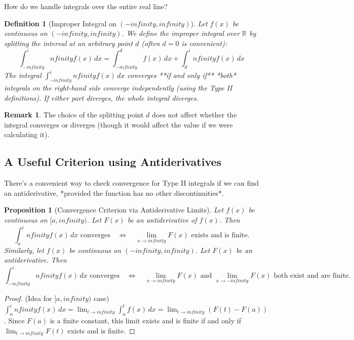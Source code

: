 \documentclass[11pt]{article}
\def\infty{infinity}%
\newtheorem{definition}[theorem]{Definition}
\newtheorem{proposition}[theorem]{Proposition}
\theoremstyle{definition}
\newtheorem{remark}[theorem]{Remark}
\newcommand{\dx}{\, dx} %
\newcommand{\R}{\mathbb{R}} %
\begin{document}
How do we handle integrals over the entire real line?

\begin{definition}[Improper Integral on $(-\infty, \infty)$]
    Let $f(x)$ be continuous on $(-\infty, \infty)$. We define the improper integral over $\R$ by splitting the interval at an arbitrary point $d$ (often $d=0$ is convenient):
    \[
    \int_{-\infty}^\infty f(x) \dx = \int_{-\infty}^d f(x) \dx + \int_d^\infty f(x) \dx
    \]
    The integral $\int_{-\infty}^\infty f(x) \dx$ converges **if and only if** *both* integrals on the right-hand side converge independently (using the Type II definitions). If either part diverges, the whole integral diverges.
\end{definition}

\begin{remark}
    The choice of the splitting point $d$ does not affect whether the integral converges or diverges (though it would affect the value if we were calculating it).
\end{remark}

\subsection{A Useful Criterion using Antiderivatives}

There's a convenient way to check convergence for Type II integrals if we can find an antiderivative, *provided the function has no other discontinuities*.

\begin{proposition}[Convergence Criterion via Antiderivative Limits] \label{prop:antideriv_limits}
    Let $f(x)$ be continuous on $[a, \infty)$. Let $F(x)$ be an antiderivative of $f(x)$. Then
    \[ \int_a^\infty f(x) \dx \text{ converges} \quad \iff \quad \lim_{x \to \infty} F(x) \text{ exists and is finite.} \]
    Similarly, let $f(x)$ be continuous on $(-\infty, \infty)$. Let $F(x)$ be an antiderivative. Then
    \[ \int_{-\infty}^\infty f(x) \dx \text{ converges} \quad \iff \quad \lim_{x \to \infty} F(x) \text{ and } \lim_{x \to -\infty} F(x) \text{ both exist and are finite.} \]
\end{proposition}

\begin{proof} (Idea for $[a, \infty)$ case)
    $\int_a^\infty f(x) \dx = \lim_{t \to \infty} \int_a^t f(x) \dx = \lim_{t \to \infty} (F(t) - F(a))$.
    Since $F(a)$ is a finite constant, this limit exists and is finite if and only if $\lim_{t \to \infty} F(t)$ exists and is finite.
\end{proof}
\end{document}
